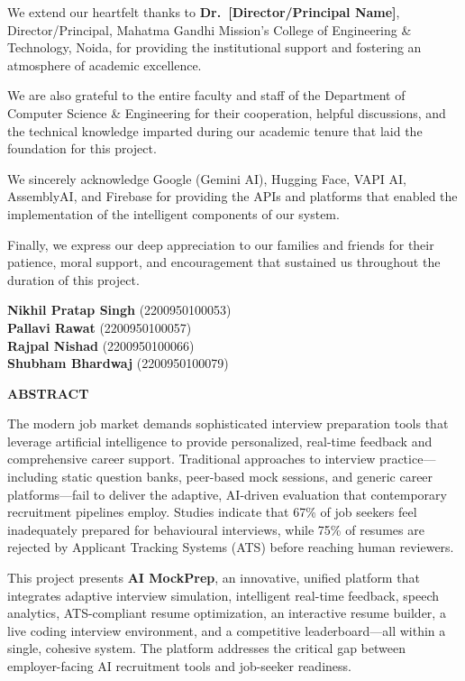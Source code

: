 \documentclass[12pt,a4paper,oneside]{report}
\newcommand{\college}{Mahatma Gandhi Mission's College of Engineering \& Technology}
\begin{document}
We extend our heartfelt thanks to \textbf{Dr.\ [Director/Principal Name]}, Director/Principal, \college, Noida, for providing the institutional support and fostering an atmosphere of academic excellence.

We are also grateful to the entire faculty and staff of the Department of Computer Science \& Engineering for their cooperation, helpful discussions, and the technical knowledge imparted during our academic tenure that laid the foundation for this project.

We sincerely acknowledge Google (Gemini AI), Hugging Face, VAPI AI, AssemblyAI, and Firebase for providing the APIs and platforms that enabled the implementation of the intelligent components of our system.

Finally, we express our deep appreciation to our families and friends for their patience, moral support, and encouragement that sustained us throughout the duration of this project.

\vspace{1.5cm}
\begin{flushright}
\textbf{Nikhil Pratap Singh} (2200950100053) \\
\textbf{Pallavi Rawat} (2200950100057) \\
\textbf{Rajpal Nishad} (2200950100066) \\
\textbf{Shubham Bhardwaj} (2200950100079) \\
\end{flushright}

\newpage
\begin{center}
{\Large\bfseries ABSTRACT}
\end{center}
\vspace{1cm}

The modern job market demands sophisticated interview preparation tools that leverage artificial intelligence to provide personalized, real-time feedback and comprehensive career support. Traditional approaches to interview practice---including static question banks, peer-based mock sessions, and generic career platforms---fail to deliver the adaptive, AI-driven evaluation that contemporary recruitment pipelines employ. Studies indicate that 67\% of job seekers feel inadequately prepared for behavioural interviews, while 75\% of resumes are rejected by Applicant Tracking Systems (ATS) before reaching human reviewers.

This project presents \textbf{AI MockPrep}, an innovative, unified platform that integrates adaptive interview simulation, intelligent real-time feedback, speech analytics, ATS-compliant resume optimization, an interactive resume builder, a live coding interview environment, and a competitive leaderboard---all within a single, cohesive system. The platform addresses the critical gap between employer-facing AI recruitment tools and job-seeker readiness.
\end{document}
